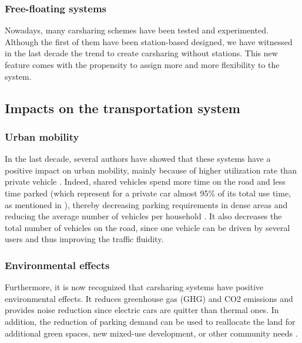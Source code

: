 \begin{bibunit}[ieeetr]
\subsubsection{Free-floating systems}
Nowadays, many carsharing schemes have been tested and experimented.
Although the first of them have been station-based designed, we have witnessed in the last decade the trend to create carsharing without stations.
This new feature comes with the propensity to assign more and more flexibility to the system.


\subsection{Impacts on the transportation system}
\subsubsection{Urban mobility}

In the last decade, several authors have showed that these systems have a positive impact on urban mobility, mainly because of higher utilization rate than private vehicle \cite{litman_evaluating_2000, schuster_assessing_2005}.
Indeed, shared vehicles spend more time on the road and less time parked (which represent for a private car almost 95\% of its total use time, as mentioned in \cite{transflash_2013}), thereby decreasing parking requirements in dense areas \cite{mitchell_reinventing_2010} and reducing the average number of vehicles per household \cite{martin_impact_2010, ter_schure_cumulative_2012}.
It also decreases the total number of vehicles on the road, since one vehicle can be driven by several users and thus improving the traffic fluidity.

\subsubsection{Environmental effects}
Furthermore, it is now recognized that carsharing systems have positive environmental effects.
It reduces greenhouse gas (GHG) and CO2 emissions \cite{martin_greenhouse_2011, firnkorn_what_2011} and provides noise reduction since electric cars are quitter than thermal ones.
In addition, the reduction of parking demand can be used to reallocate the land for additional green spaces, new mixed-use development, or other community needs \cite{cohen_carsharing_2008}.




\end{bibunit}
